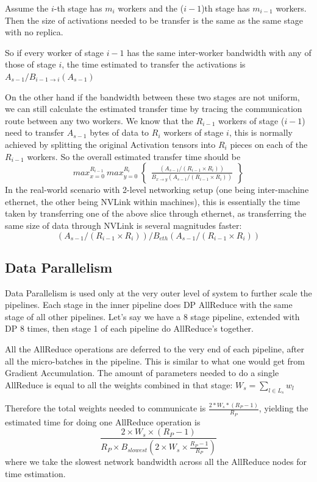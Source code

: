 \documentclass[12pt,letterpaper]{article}
\begin{document}
Assume the $i$-th stage has $m_i$ workers and the ($i-1$)th stage has $m_{i-1}$ workers. Then the size of activations needed to be transfer is the same as the same stage with no replica. 

So if every worker of stage $i-1$  has the same inter-worker bandwidth with any of those of stage $i$, the time estimated to transfer the activations is $A_{s-1} / B_{i-1 \to i}(A_{s-1})$

On the other hand if the bandwidth between these two stages are not uniform, we can still calculate the estimated transfer time by tracing the communication route between any two workers.
We know that the $R_{i-1}$ workers of stage ($i-1$) need to transfer $A_{s-1}$ bytes of data to $R_i$ workers of stage $i$, this is normally achieved by splitting the original Activation tensors into $R_i$ pieces on each of the $R_{i-1}$ workers. So the overall estimated transfer time should be 
$$max_{x=0}^{R_{i-1}}\ max_{y=0}^{R_i}\ \left\{\begin{array}{lr}
        	\frac{(A_{s-1}/(R_{i-1} \times R_i))}{B_{x \to y}(A_{s-1}/(R_{i-1} \times R_i))}
        \end{array}\right\}$$
In the real-world scenario with 2-level networking setup (one being inter-machine ethernet, the other being NVLink within machines), this is essentially the time taken by transferring one of the above slice through ethernet, as transferring the same size of data through NVLink is several magnitudes faster: 
$$(A_{s-1}/(R_{i-1} \times R_i)) / B_{eth}(A_{s-1}/(R_{i-1}\times R_i))$$

\subsection {Data Parallelism}
Data Parallelism is used only at the very outer level of system to further scale the pipelines. Each stage in the inner pipeline does DP AllReduce with the same stage of all other pipelines. Let's say we have a 8 stage pipeline, extended with DP 8 times, then stage 1 of each pipeline do AllReduce's together. 

All the AllReduce operations are deferred to the very end of each pipeline, after all the micro-batches in the pipeline. This is similar to what one would get from Gradient Accumulation. The amount of parameters needed to do a single AllReduce is equal to all the weights combined in that stage: $W_s = \sum_{l \in L_s} w_l$

Therefore the total weights needed to communicate is $\frac{2*W_s * (R_P-1)}{R_P}$, yielding the estimated time for doing one AllReduce operation is
$$\frac{2 \times W_s \times (R_P-1)}{R_P \times B_{slowest}(2 \times W_s \times  \frac{R_P-1}{R_P})}$$
where we take the slowest network bandwidth across all the AllReduce nodes for time estimation. 
\end{document}
